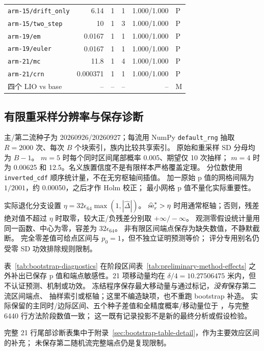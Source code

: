 \documentclass[UTF8,11pt]{ctexart}
\begin{document}
\begin{longtable}{lrrrrl}
\texttt{arm-15/drift\_only} & 6.14 & 1 & 1 & 1.000/1.000 & P\\
\texttt{arm-15/two\_step} & 10 & 1 & 3 & 1.000/1.000 & P\\
\texttt{arm-19/em} & 0.0167 & 1 & 1 & 1.000/1.000 & P\\
\texttt{arm-19/euler} & 0.0167 & 1 & 1 & 1.000/1.000 & P\\
\texttt{arm-21/mc} & 11.8 & 1 & 4 & 1.000/1.000 & P\\
\texttt{arm-21/crn} & 0.000371 & 1 & 1 & 1.000/1.000 & P\\
四个 LIO vs base & -- & -- & -- & -- & M\\
\end{longtable}

\subsection{有限重采样分辨率与保存诊断}
\label{sec:bootstrap-resolution}
主/第二流种子为 20260926/20260927；每流用 NumPy \texttt{default\_rng}
抽取 \(R=2000\) 次、每次 \(B\) 个块索引，族内比较共享索引。
原始和重采样 SD 分母均为 \(B-1\)。
\(m=5\) 时每个同时区间尾部概率 0.005、期望仅 10 次抽样；
\(m=4\) 时为 0.00625 和 12.5。名义族置信度不是有限样本严格覆盖定理。
分位数使用 \texttt{inverted\_cdf} 顺序统计量，不在无穷枢轴间插值。
加一原始 p 值的网格间隔为 \(1/2001\)，约 0.00050，之后才作 Holm 校正；
最小网格 p 值不量化实际重要性。

实际退化分支设置 \(\eta=32\epsilon_{64}\max(1,|\widehat\Delta|)\)。
\(\widehat{\rm se}_r^*>\eta\) 时用通常枢轴；否则，残差绝对值不超过
\(\eta\) 时取零，较大正/负残差分别取 \(+\infty/-\infty\)。
观测零假设统计量用同一函数、中心为零，容差为 \(32\epsilon_{64}\)。
非有限区间端点保存为缺失数值，不静默截断。
完全零差值可给点区间与 \(p_0=1\)，但不独立证明预测等价；
评分专用别名仍受零 SD 功效排除规则限制。

表~\ref{tab:bootstrap-diagnostics} 在阶段区间表~\ref{tab:preliminary-method-effects}
之外补出已保存 p 值和端点敏感性。21 项移动量均在
\(\delta/4=10.27506475\) 米内，但不认证预测、机制或功效。
冻结程序保存最大移动量与通过标记，\emph{没有}保存第二流区间端点、
抽样索引或枢轴；这里不编造缺项，也不重跑 bootstrap 补造。
实际保留的主同时/边际区间、五个种子差值和全精度概率/移动量位于
，与完整 6440 行方法阶段数值一致；
这一既有记录投影不是新的最终分析或假设检验。

完整 21 行尾部诊断表集中于附录~\ref{sec:bootstrap-table-detail}，作为主要效应区间的补充；
未保存第二随机流完整端点仍是复现限制。
\end{document}
